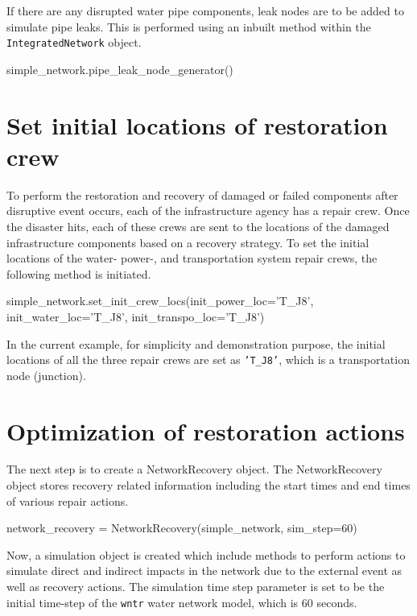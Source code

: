 \documentclass[letterpaper,12pt,english]{sphinxmanual}
\begin{document}
If there are any disrupted water pipe components, leak nodes are to be added to simulate pipe leaks. This is performed using an inbuilt method within the {\tt IntegratedNetwork} object.

\begin{sphinxVerbatim}[commandchars=\\\{\}]
simple_network.pipe_leak_node_generator()
\end{sphinxVerbatim}


\section{Set initial locations of restoration crew}
To perform the restoration and recovery of damaged or failed components after  disruptive event occurs, each of the infrastructure agency has a repair crew. Once the disaster hits, each of these crews are sent to the locations of the damaged infrastructure components based on a recovery strategy. To set the initial locations of the water- power-, and transportation system repair crews, the following method is initiated.

\begin{sphinxVerbatim}[commandchars=\\\{\}]
simple_network.set_init_crew_locs(init_power_loc='T_J8', init_water_loc='T_J8', init_transpo_loc='T_J8')
\end{sphinxVerbatim}

In the current example, for simplicity and demonstration purpose, the initial locations of all the three repair crews are set as {\tt 'T_J8'}, which is a transportation node (junction).

\section{Optimization of restoration actions}
The next step is to create a NetworkRecovery object. The NetworkRecovery object stores recovery related information including the start times and end times of various repair actions.

\begin{sphinxVerbatim}[commandchars=\\\{\}]
network_recovery = NetworkRecovery(simple_network, sim_step=60)
\end{sphinxVerbatim}

Now, a simulation object is created which include methods to perform actions to simulate direct and indirect impacts in the network due to the external event as well as recovery actions. The simulation time step parameter is set to be the initial time-step of the {\tt wntr} water network model, which is 60 seconds.
\end{document}
